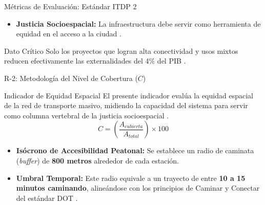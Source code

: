 \begin{frame}{Métricas de Evaluación: Estándar ITDP 2}
        \begin{itemize}
        \item \textbf{Justicia Socioespacial:} La infraestructura debe servir como herramienta de equidad en el acceso a la ciudad \cite{SEDATU2023}.
    \end{itemize}
    \begin{exampleblock}{Dato Crítico}
                Solo los proyectos que logran alta conectividad y usos mixtos reducen efectivamente las externalidades 
                del 4\% del PIB \cite{IMCO2019Doc}.
    \end{exampleblock}
\end{frame}

\begin{frame}{R-2: Metodología del Nivel de Cobertura ($C$)}
    \begin{block}{Indicador de Equidad Espacial}
        El presente indicador evalúa la equidad espacial de la red de transporte masivo, midiendo la capacidad del sistema para servir como columna 
        vertebral de la justicia socioespacial \cite{Garibaldi2024_R02, SEDATU2023}.
        \begin{equation}
            C = \left( \frac{A_{cubierta}}{A_{total}} \right) \times 100
        \end{equation}
    \end{block}

    \begin{itemize}
        \item \textbf{Isócrono de Accesibilidad Peatonal:} Se establece un radio de caminata (\textit{buffer}) de \textbf{800 metros} 
                alrededor de cada estación.
        \item \textbf{Umbral Temporal:} Este radio equivale a un trayecto de entre \textbf{10 a 15 minutos caminando}, 
                alineándose con los principios de Caminar y Conectar del estándar DOT \cite{ITDP_Espacio}.
    \end{itemize}
\end{frame}

